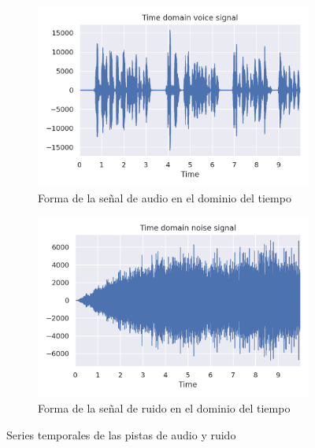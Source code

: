 \begin{figure}[h!]
	\centering
	\begin{subfigure}[t]{0.5\textwidth}
		\centering
		\includegraphics[width=0.9\columnwidth]{figures/audio_book_time.png}
		\caption{Forma de la señal de audio en el dominio del tiempo}
		\label{fig: voice_time}
	\end{subfigure}%
	\hspace*{10pt}
	\begin{subfigure}[t]{0.5\textwidth}
		\centering
		\includegraphics[width=0.9\columnwidth]{figures/noise_time.png}
		\caption{Forma de la señal de ruido en el dominio del tiempo}
		\label{fig: noise_time}
	\end{subfigure}
	\caption{Series temporales de las pistas de audio y ruido}
\end{figure}
